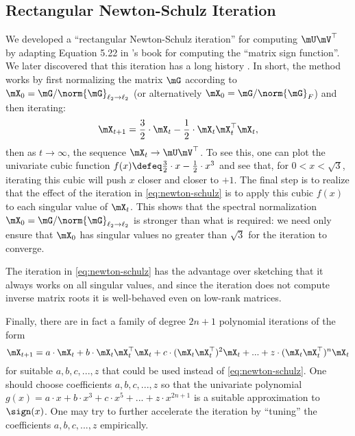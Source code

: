 \subsection{Rectangular Newton-Schulz Iteration}

We developed a ``rectangular Newton-Schulz iteration'' for computing $\mU\mV^\top$ by adapting Equation 5.22 in \citet{higham}'s book for computing the ``matrix sign function''. We later discovered that this iteration has a long history \citep{kovarik1970iterative, bjoerck1971}. In short, the method works by first normalizing the matrix $\mG$ according to $\mX_0 = \mG / \norm{\mG}_{\ell_2 \to \ell_2}$ (or alternatively $\mX_0 = \mG / \norm{\mG}_F$) and then iterating:
    \begin{equation}\label{eq:newton-schulz}
        \mX_{t+1} = \frac{3}{2} \cdot \mX_t - \frac{1}{2} \cdot \mX_t \mX_t^\top \mX_t,
    \end{equation}
    then as $t\to\infty$, the sequence $\mX_t \to \mU \mV^\top$. To see this, one can plot the univariate cubic function $f(x) \defeq \tfrac{3}{2} \cdot x - \tfrac{1}{2}\cdot x^3$ and see that, for $0 < x < \sqrt{3}$, iterating this cubic will push $x$ closer and closer to $+1$. The final step is to realize that the effect of the iteration in \cref{eq:newton-schulz} is to apply this cubic $f(x)$ to each singular value of $\mX_t$. This shows that the spectral normalization $\mX_0 = \mG / \norm{\mG}_{\ell_2 \to \ell_2}$ is stronger than what is required: we need only ensure that $\mX_0$ has singular values no greater than $\sqrt{3}$ for the iteration to converge.

    The iteration in \cref{eq:newton-schulz} has the advantage over sketching that it always works on all singular values, and since the iteration does not compute inverse matrix roots it is well-behaved even on low-rank matrices.

    Finally, there are in fact a family of degree $2n+1$ polynomial iterations of the form
    \begin{equation}
    \mX_{t+1} = a \cdot \mX_t + b  \cdot \mX_t \mX_t^\top \mX_t + c \cdot (\mX_t \mX_t^\top)^2 \mX_t + ... + z \cdot (\mX_t \mX_t^\top)^n \mX_t
    \end{equation}
    for suitable $a,b,c,...,z$  that could be used instead of \cref{eq:newton-schulz}. One should choose coefficients $a, b,c,...,z$ so that the univariate polynomial $g(x) = a \cdot x + b \cdot x^3 + c \cdot x^5 + ... + z\cdot x^{2n+1}$ is a suitable approximation to $\sign(x)$. One may try to further accelerate the iteration by ``tuning'' the coefficients $a,b,c,...,z$ empirically.

